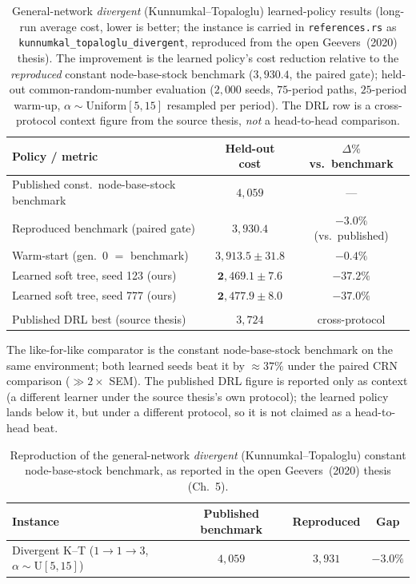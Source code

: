 \begin{table}[!htbp]
\centering
\caption{General-network \emph{divergent} (Kunnumkal--Topaloglu) learned-policy results (long-run
average cost, lower is better; the instance is carried in \texttt{references.rs} as
\texttt{kunnumkal\_topaloglu\_divergent}, reproduced from the open Geevers~(2020) thesis). The
improvement is the learned policy's cost reduction relative to the \emph{reproduced} constant
node-base-stock benchmark ($3{,}930.4$, the paired gate); held-out common-random-number evaluation
($2{,}000$ seeds, $75$-period paths, $25$-period warm-up, $\alpha\sim\mathrm{Uniform}[5,15]$ resampled
per period). The DRL row is a cross-protocol context figure from the source thesis, \emph{not} a
head-to-head comparison.}
\label{tab:divergent-kt-results}
\begin{tabular}{lcc}
\toprule
Policy / metric & Held-out cost & $\Delta\%$ vs.\ benchmark \\
\midrule
Published const.\ node-base-stock benchmark & $4{,}059$ & --- \\
Reproduced benchmark (paired gate) & $3{,}930.4$ & $-3.0\%$ (vs.\ published) \\
Warm-start (gen.\ 0 $=$ benchmark) & $3{,}913.5 \pm 31.8$ & $-0.4\%$ \\
Learned soft tree, seed 123 (ours) & $\mathbf{2{,}469.1 \pm 7.6}$ & $\mathbf{-37.2\%}$ \\
Learned soft tree, seed 777 (ours) & $\mathbf{2{,}477.9 \pm 8.0}$ & $\mathbf{-37.0\%}$ \\
\addlinespace[2pt]
\multicolumn{3}{l}{\footnotesize Cross-protocol context (not head-to-head):} \\
Published DRL best (source thesis) & $3{,}724$ & cross-protocol \\
\bottomrule
\end{tabular}
\par\medskip\footnotesize The like-for-like comparator is the constant node-base-stock benchmark on
the same environment; both learned seeds beat it by $\approx 37\%$ under the paired CRN comparison
($\gg 2\times$ SEM). The published DRL figure is reported only as context (a different learner under
the source thesis's own protocol); the learned policy lands below it, but under a different protocol,
so it is not claimed as a head-to-head beat.
\end{table}
\FloatBarrier


\begin{table}[!htbp]
\centering
\caption{Reproduction of the general-network \emph{divergent} (Kunnumkal--Topaloglu) constant
node-base-stock benchmark, as reported in the open Geevers~(2020) thesis (Ch.~5).}
\label{tab:divergent-kt-validation}
\begin{tabular}{lccc}
\toprule
Instance & Published benchmark & Reproduced & Gap \\
\midrule
Divergent K--T ($1{\to}1{\to}3$, $\alpha\sim\mathrm{U}[5,15]$) & $4{,}059$ & $3{,}931$ & $-3.0\%$ \\
\bottomrule
\end{tabular}
\end{table}
\FloatBarrier
